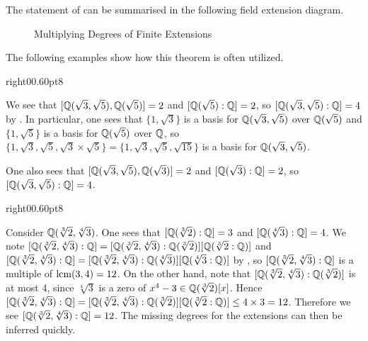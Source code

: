 The statement of  can be summarised in the following field extension diagram.

\begin{figure}[H]
    \centering
    \caption{Multiplying Degrees of Finite Extensions}
\end{figure}

The following examples show how this theorem is often utilized.

\begin{examplewithcutout}{right}{0}{0.6\textwidth}{0pt}{8}{
    \begin{figure}[H]
        \centering
    \end{figure}
}
    We see that $[\mathbb{Q}(\sqrt3, \sqrt5), \mathbb{Q}(\sqrt5)] = 2$ and $[\mathbb{Q}(\sqrt5):\mathbb{Q}] = 2$, so $[\mathbb{Q}(\sqrt3, \sqrt5):\mathbb{Q}] = 4$ by . In particular, one sees that $\{1, \sqrt3\}$ is a basis for $\mathbb{Q}(\sqrt3,\sqrt5)$ over $\mathbb{Q}(\sqrt5)$ and $\{1, \sqrt5\}$ is a basis for $\mathbb{Q}(\sqrt5)$ over $\mathbb{Q}$, so $\{1, \sqrt3, \sqrt5, \sqrt3\times\sqrt5\} = \{1, \sqrt3, \sqrt5, \sqrt{15}\}$ is a basis for $\mathbb{Q}(\sqrt3, \sqrt5)$.
    
    One also sees that $[\mathbb{Q}(\sqrt3, \sqrt5), \mathbb{Q}(\sqrt3)] = 2$ and $[\mathbb{Q}(\sqrt3):\mathbb{Q}] = 2$, so $[\mathbb{Q}(\sqrt3, \sqrt5):\mathbb{Q}] = 4$.
\end{examplewithcutout}

\begin{examplewithcutout}{right}{0}{0.6\textwidth}{0pt}{8}{
    \begin{figure}[H]
        \centering
    \end{figure}
}
    Consider $\mathbb{Q}(\sqrt[3]2, \sqrt[4]3)$. One sees that $[\mathbb{Q}(\sqrt[3]2):\mathbb{Q}] = 3$ and $[\mathbb{Q}(\sqrt[4]3):\mathbb{Q}] = 4$. We note $[\mathbb{Q}(\sqrt[3]2, \sqrt[4]3):\mathbb{Q}] = [\mathbb{Q}(\sqrt[3]2, \sqrt[4]3):\mathbb{Q}(\sqrt[3]2)][\mathbb{Q}(\sqrt[3]2:\mathbb{Q})]$ and $[\mathbb{Q}(\sqrt[3]2, \sqrt[4]3):\mathbb{Q}] = [\mathbb{Q}(\sqrt[3]2, \sqrt[4]3):\mathbb{Q}(\sqrt[4]3)][\mathbb{Q}(\sqrt[4]3:\mathbb{Q})]$ by , so $[\mathbb{Q}(\sqrt[3]2, \sqrt[4]3):\mathbb{Q}]$ is a multiple of $\mathrm{lcm}(3, 4) = 12$. On the other hand, note that $[\mathbb{Q}(\sqrt[3]2, \sqrt[4]3):\mathbb{Q}(\sqrt[3]2)]$ is at most 4, since $\sqrt[4]3$ is a zero of $x^4 - 3 \in \mathbb{Q}(\sqrt[3]2)[x]$. Hence $[\mathbb{Q}(\sqrt[3]2, \sqrt[4]3):\mathbb{Q}] = [\mathbb{Q}(\sqrt[3]2, \sqrt[4]3):\mathbb{Q}(\sqrt[3]2)][\mathbb{Q}(\sqrt[3]2:\mathbb{Q})] \leq 4 \times 3 = 12$. Therefore we see $[\mathbb{Q}(\sqrt[3]2, \sqrt[4]3):\mathbb{Q}] = 12$. The missing degrees for the extensions can then be inferred quickly.
\end{examplewithcutout}

